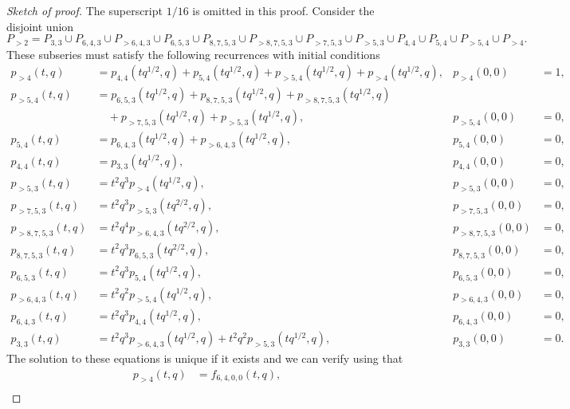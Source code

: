 \documentclass[12pt, reqno]{amsart}
\theoremstyle{remark}
\begin{document}
\begin{proof}[Sketch of proof]
  The superscript $1/16$ is omitted in this proof.
  Consider the disjoint union
  \begin{equation*}
    P_{>2} = P_{3, 3} \cup P_{6, 4, 3} \cup P_{>6, 4, 3} \cup P_{6, 5, 3} \cup P_{8, 7, 5, 3} \cup P_{>8, 7, 5, 3} \cup P_{>7, 5, 3} \cup P_{>5, 3} \cup P_{4, 4} \cup P_{5, 4} \cup P_{>5, 4} \cup P_{>4}.
  \end{equation*}
  These subseries must satisfy the following recurrences with initial conditions
  \begin{align*}
    p_{>4}(t, q) &= p_{4, 4} (tq^{1/2}, q) + p_{5, 4}(tq^{1/2}, q) + p_{>5, 4}(tq^{1/2}, q) + p_{>4}(tq^{1/2}, q), &p_{>4}(0, 0) &= 1, \\
    p_{>5, 4}(t, q) &= p_{6, 5, 3}(tq^{1/2}, q) + p_{8, 7, 5, 3}(tq^{1/2}, q) + p_{>8, 7, 5, 3}(tq^{1/2}, q) \\
    &\quad + p_{>7, 5, 3}(tq^{1/2}, q) + p_{>5, 3}(tq^{1/2}, q), &p_{>5, 4}(0, 0) &= 0, \\
    p_{5, 4}(t, q) &= p_{6, 4, 3}(tq^{1/2}, q) + p_{>6, 4, 3}(tq^{1/2}, q), &p_{5, 4}(0, 0) &= 0, \\
    p_{4, 4}(t, q) &= p_{3, 3}(tq^{1/2}, q), &p_{4, 4}(0, 0) &= 0, \\
    p_{>5, 3}(t, q) &= t^2q^3p_{>4}(tq^{1/2}, q), &p_{>5, 3}(0, 0) &= 0, \\
    p_{>7, 5, 3}(t, q) &= t^2q^3p_{>5, 3}(tq^{2/2}, q), &p_{>7, 5, 3}(0, 0) &= 0, \\
    p_{>8, 7, 5, 3}(t, q) &= t^2q^4p_{>6, 4, 3}(tq^{2/2}, q), &p_{>8, 7, 5, 3}(0, 0) &= 0, \\
    p_{8, 7, 5, 3}(t, q) &= t^2q^3p_{6, 5, 3}(tq^{2/2}, q), &p_{8, 7, 5, 3}(0, 0) &= 0, \\
    p_{6, 5, 3}(t, q) &= t^2q^3p_{5, 4}(tq^{1/2}, q), &p_{6, 5, 3}(0, 0) &= 0, \\
    p_{>6, 4, 3}(t, q) &= t^2q^2p_{>5, 4}(tq^{1/2}, q), &p_{>6, 4, 3}(0, 0) &= 0, \\
    p_{6, 4, 3}(t, q) &= t^2q^3p_{4, 4}(tq^{1/2}, q), &p_{6, 4, 3}(0, 0) &= 0, \\
    p_{3, 3}(t, q) &= t^2q^3p_{>6, 4, 3}(tq^{1/2}, q) + t^2q^2p_{>5, 3}(tq^{1/2}, q), &p_{3, 3}(0, 0) &= 0.
  \end{align*}
  The solution to these equations is unique if it exists and we can verify using  that
  \begin{align*}
    p_{>4}(t, q) &= f_{6, 4, 0, 0}(t, q), \\

\end{align*}
\end{proof}
\end{document}
